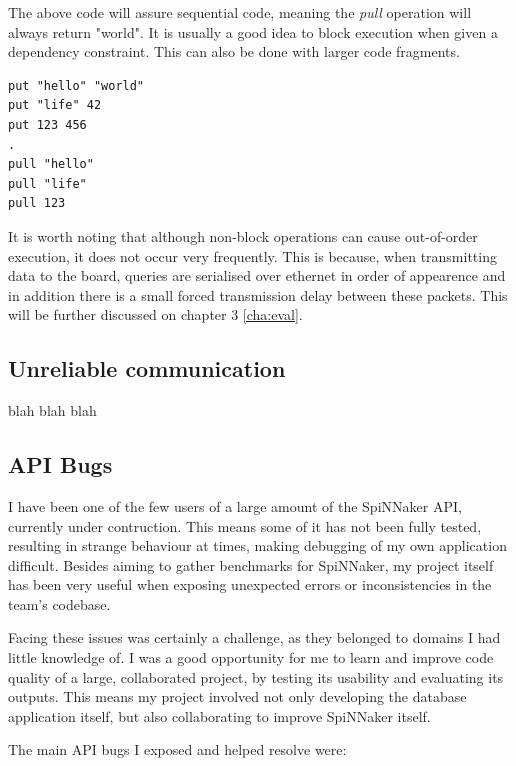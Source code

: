 The above code will assure sequential code, meaning the \textit{pull} operation will always return "world". It is usually a good idea to block execution when given a dependency constraint. This can also be done with larger code fragments.

\begin{lstlisting}[caption={Blocking execution}, label=list:blocking2]
put "hello" "world"
put "life" 42
put 123 456
.
pull "hello"
pull "life"
pull 123
\end{lstlisting}

It is worth noting that although non-block operations can cause out-of-order execution, it does not occur very frequently. This is because, when transmitting data to the board, queries are serialised over ethernet in order of appearence and in addition there is a small forced transmission delay between these packets. This will be further discussed on chapter 3 \ref{cha:eval}.

\subsection{Unreliable communication}
blah blah blah

\subsection{API Bugs}
I have been one of the few users of a large amount of the SpiNNaker API, currently under contruction. This means some of it has not been fully tested, resulting in strange behaviour at times, making debugging of my own application difficult. Besides aiming to gather benchmarks for SpiNNaker, my project itself has been very useful when exposing unexpected errors or inconsistencies in the team's codebase.

Facing these issues was certainly a challenge, as they belonged to domains I had little knowledge of. I was a good opportunity for me to learn and improve code quality of a large, collaborated project, by testing its usability and evaluating its outputs. This means my project involved not only developing the database application itself, but also collaborating to improve SpiNNaker itself.

The main API bugs I exposed and helped resolve were:

